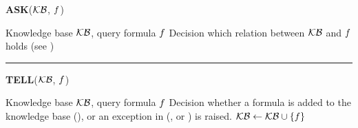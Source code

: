 \begin{algorithm}[hbt!]
    \caption{Contraction Knowledge Base with operations ASK and TELL}\label{alg:contractionKB}
    \vspace{0.3cm} \textbf{ASK}($\mathcal{KB}$, $f$)
    \begin{algorithmic}
    \iosepline
    \Require Knowledge base $\mathcal{KB}$, query formula $f$
    \Ensure Decision which relation between $\mathcal{KB}$ and $f$ holds (see )
    \iosepline
        \State{$\hypercoreat{\formulavar} \algdefsymbol \contractionof{\{\secexformulaat{\shortcatvariables} \wcols \secexformula\in\kb\},\bencodingofat{\exformula}{\formulavar,\shortcatvariables}}{\formulavar}$}
            \State \Return {}
            \State \Return {}
            \State \Return {}
        \Else
            \State \Return {}
        \EndIf
    \vspace{0.1cm}
    \hrule
    \end{algorithmic}
    \vspace{0.3cm} \textbf{TELL}($\mathcal{KB}$, $f$)
    \begin{algorithmic}
        \iosepline
    \Require Knowledge base $\mathcal{KB}$, query formula $f$
    \Ensure Decision whether a formula is added to the knowledge base (), or an exception in (,  or ) is raised.
    \iosepline
            \State \Return {}
            \State \Return {}
            \State \Return {}
            \State $\mathcal{KB} \leftarrow \mathcal{KB}\cup\{f\}$
            \State \Return {}
        \EndIf
    \end{algorithmic}

\end{algorithm}
